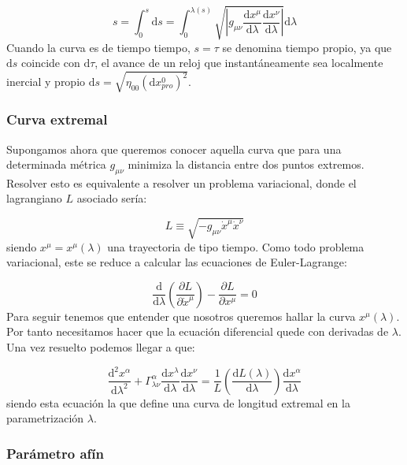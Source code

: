 \documentclass[12pt,a4paper]{book}
\numberwithin{equation}{section}
\numberwithin{figure}{section}
\newcommand{\parentesis}[1]{\left( #1  \right)}
\newcommand{\parciales}[2]{\frac{\partial #1}{\partial #2}}
\newcommand{\D}{\mathrm{d}}
\newcommand{\derivadas}[2]{\frac{\D #1}{\D #2}}
\begin{document}
\begin{equation}
s = \int_0^s \D s = \int_0^{\lambda(s)} \sqrt{\left| g_{\mu \nu} \derivadas{x^\mu}{\lambda} \derivadas{x^\nu}{\lambda} \right|} \D \lambda
\end{equation}
Cuando la curva es de tiempo tiempo, $s=\tau$ se denomina tiempo propio, ya que $\D s $ coincide con $\D \tau$, el avance de un reloj que instantáneamente sea localmente inercial y propio $\D s = \sqrt{\eta_{00} (\D x^0_{pro})^2}$. \\

\subsubsection{Curva extremal}

Supongamos ahora que queremos conocer aquella curva que para una determinada métrica $g_{\mu \nu}$ minimiza la distancia entre dos puntos extremos. Resolver esto es equivalente a resolver un problema variacional, donde el lagrangiano $L$ asociado sería:

\begin{equation}
L \equiv \sqrt{-g_{\mu \nu} \dot{x}^\mu \dot{x}^\nu}
\end{equation}
siendo $x^\mu = x^\mu (\lambda)$ una trayectoria de tipo tiempo. Como todo problema variacional, este se reduce a calcular las ecuaciones de Euler-Lagrange: 

\begin{equation}
\dfrac{\D }{\D \lambda} \parentesis{\parciales{L}{\dot{x}^\mu}} - \parciales{L}{x^\mu} = 0
\end{equation}
Para seguir tenemos que entender que nosotros queremos hallar la curva $x^\mu(\lambda)$. Por tanto necesitamos hacer que la ecuación diferencial quede con derivadas de $\lambda$. Una vez resuelto podemos llegar a que:

\begin{equation}
\derivadas{^2 x^\alpha}{\lambda^2} + \Gamma^\alpha_{\lambda \nu} \derivadas{x^\lambda}{\lambda} \derivadas{x^\nu}{\lambda} = \dfrac{1}{L} \parentesis{\derivadas{L (\lambda)}{\lambda}} \derivadas{x^\alpha}{\lambda} 
\end{equation} 
siendo esta ecuación la que define una curva de longitud extremal en la parametrización $\lambda$.

\subsubsection{Parámetro afín}
\end{document}

